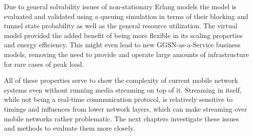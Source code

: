Due to general solvability issues of non-stationary Erlang models the model is evaluated and validated using a queuing simulation in terms of their blocking and tunnel state probability as well as the general resource utilization. The virtual model provided the added benefit of being more flexible in its scaling properties and energy efficiency. This might even lead to new \gls{GGSN}-as-a-Service business models, removing the need to provide and operate large amounts of infrastructure for rare cases of peak load. 

All of these properties serve to show the complexity of current mobile network systems even without running media streaming on top of it. Streaming in itself, while not being a real-time communication protocol, is relatively sensitive to timings and influences from lower network layers, which can make streaming over mobile networks rather problematic. The next chapters investigate these issues and methods to evaluate them more closely.




